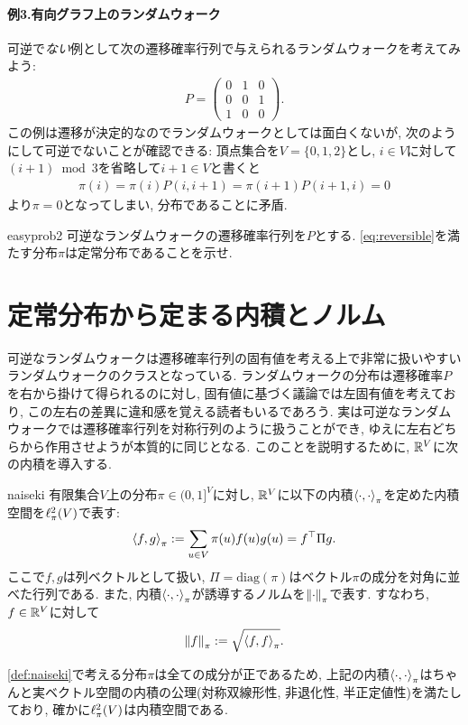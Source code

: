 \paragraph*{例3.有向グラフ上のランダムウォーク}
可逆で\emph{ない}例として次の遷移確率行列で与えられるランダムウォークを考えてみよう:
\begin{align*}
    P = \begin{pmatrix}
            0 & 1 & 0 \\
            0 & 0 & 1 \\
            1 & 0 & 0
        \end{pmatrix}.
\end{align*}
この例は遷移が決定的なのでランダムウォークとしては面白くないが,
次のようにして可逆でないことが確認できる:
頂点集合を$V=\{0,1,2\}$とし, $i\in V$に対して$(i+1)\bmod 3$を省略して$i+1 \in V$と書くと
\begin{align*}
    \pi(i) = \pi(i) P(i, i+1) = \pi(i+1)P(i+1,i) = 0
\end{align*}
より$\pi=0$となってしまい, 分布であることに矛盾.

\begin{exercise}{easy}{prob2}
    可逆なランダムウォークの遷移確率行列を$P$とする.
    \cref{eq:reversible}を満たす分布$\pi$は定常分布であることを示せ.
\end{exercise}

%


\section{定常分布から定まる内積とノルム}
可逆なランダムウォークは遷移確率行列の固有値を考える上で非常に扱いやすいランダムウォークのクラスとなっている.
ランダムウォークの分布は遷移確率$P$を右から掛けて得られるのに対し,
    固有値に基づく議論では左固有値を考えており,
この左右の差異に違和感を覚える読者もいるであろう.
実は可逆なランダムウォークでは遷移確率行列を対称行列のように扱うことができ,
ゆえに左右どちらから作用させようが本質的に同じとなる.
このことを説明するために, $\mathbb{R}^V$に次の内積を導入する.
\begin{definition}{}{naiseki}
    有限集合$V$上の分布$\pi\in(0,1]^V$に対し,
    $\mathbb{R}^V$に以下の内積$\left\langle\cdot,\cdot\right\rangle_{\pi}$を定めた内積空間を$\ell^2_\pi(V)$で表す:
    \begin{align*}
        \left\langle f,g\right\rangle_{\pi} \mathrel{:=} \sum_{u \in V} \pi(u) f(u) g(u)
        = f^\top \Pi g.
    \end{align*}
    ここで$f,g$は列ベクトルとして扱い, $\Pi=\mathrm{diag}(\pi)$はベクトル$\pi$の成分を対角に並べた行列である.
    また, 内積$\left\langle\cdot,\cdot\right\rangle_{\pi}$が誘導するノルムを$\left\lVert\cdot\right\rVert_{\pi}$で表す.
    すなわち, $f\in\mathbb{R}^V$に対して
    \[
        \left\lVert f\right\rVert_{\pi} \mathrel{:=} \sqrt{\left\langle f,f\right\rangle_{\pi}}.
    \]
\end{definition}
\cref{def:naiseki}で考える分布$\pi$は全ての成分が正であるため,
上記の内積$\left\langle\cdot,\cdot\right\rangle_{\pi}$はちゃんと実ベクトル空間の内積の公理(対称双線形性, 非退化性, 半正定値性)を満たしており,
確かに$\ell^2_\pi(V)$は内積空間である.

